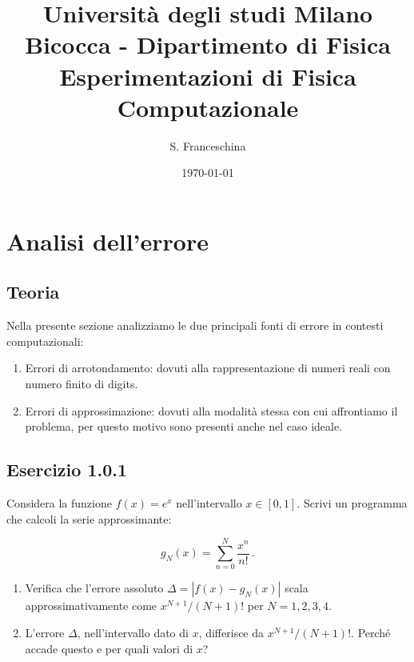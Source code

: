 \documentclass[letterpaper, 12pt]{article}
\begin{document}
\title{{\small Università degli studi Milano Bicocca - Dipartimento di Fisica}\\
	Esperimentazioni di Fisica Computazionale}
\author{S. Franceschina}
\date{\today}
\maketitle
\thispagestyle{logoheader}

\begin{abstract} 
	\begin{adjustwidth}{-1cm}{-1cm}
	\end{adjustwidth}
\end{abstract}
\tableofcontents
\newpage

\section{Analisi dell'errore}
\subsection{Teoria}
Nella presente sezione analizziamo le due principali fonti di errore in contesti computazionali: 
\begin{enumerate}
    \item Errori di arrotondamento: dovuti alla rappresentazione di numeri reali con numero finito di digits.
    \item Errori di approssimazione: dovuti alla modalità stessa con cui affrontiamo il problema, 
          per questo motivo sono presenti anche nel caso ideale. 
\end{enumerate}

\subsection{Esercizio 1.0.1}
Considera la funzione $f(x)=e^x$ nell'intervallo $x\in [0,1]$. Scrivi un programma che calcoli la serie approssimante:

\begin{equation}
    g_N(x)=\sum_{n=0}^N \frac{x^n}{n!}\,.
\end{equation}

\begin{enumerate}
    \item Verifica che l'errore assoluto $\Delta=|f(x)-g_N(x)|$ scala approssimativamente come $x^{N+1}/(N+1)!$ per $N=1,2,3,4$.
    \item L'errore $\Delta$, nell'intervallo dato di $x$, differisce da $x^{N+1}/(N+1)!$. Perché accade questo e per quali valori di $x$?
\end{enumerate}
\end{document}
